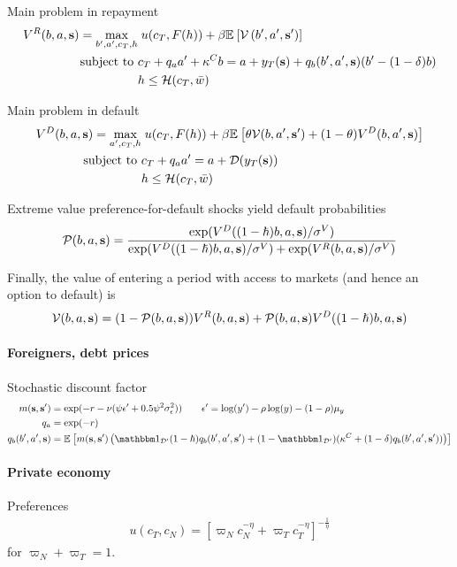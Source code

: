 Main problem in repayment
\begin{align}
	V^R(b,a,\text{\textbf{s}}) = \max_{b',a',c_T, h} &\; u(c_T, F(h)) + \beta \mathbb{E}_{{}}\left[ \mathcal{V}\left(b',a',\text{\textbf{s}}'\right) \right] \\
	\text{subject to }
	& c_T + q_a a' + \kappa^C b = a + y_T(\text{\textbf{s}}) + q_b(b',a',\text{\textbf{s}}) (b' - (1-\delta) b) \notag\\
	& h \leq \mathcal{H}(c_T, \bar{w}) \notag
\end{align}

Main problem in default
\begin{align}
	V^D(b,a,\text{\textbf{s}}) = \max_{a',c_T, h} &\; u(c_T, F(h)) + \beta \mathbb{E}_{{}}\left[  \theta \mathcal{V}(b,a',\text{\textbf{s}}') + (1-\theta) V^D(b,a',\text{\textbf{s}})  \right] \\
	\text{subject to }
	& c_T + q_a a' = a + \mathcal{D}(y_T(\text{\textbf{s}})) \notag \\
	& h \leq \mathcal{H}(c_T, \bar{w}) \notag
\end{align}

Extreme value preference-for-default shocks yield default probabilities
\begin{align}
	\mathcal{P}(b,a,\text{\textbf{s}}) = \frac{ \exp(V^D((1-\hslash)b,a,\text{\textbf{s}}) / \sigma^V) }{\exp(V^D((1-\hslash)b,a,\text{\textbf{s}}) / \sigma^V) + \exp(V^R(b,a,\text{\textbf{s}}) / \sigma^V)}
\end{align}

Finally, the value of entering a period with access to markets (and hence an option to default) is
\begin{align}
	\mathcal{V}(b,a,\text{\textbf{s}}) = (1-\mathcal{P}(b,a,\text{\textbf{s}})) V^R(b,a,\text{\textbf{s}}) + \mathcal{P}(b,a,\text{\textbf{s}}) V^D((1-\hslash)b,a,\text{\textbf{s}})
\end{align}

\paragraph{Foreigners, debt prices}
Stochastic discount factor
\begin{align}
	m(\state, \state') &= \exp(-r - \nu (\psi \epsilon' + 0.5 \psi^2\sigma_\epsilon^2)) \qquad \epsilon' = \log(y') - \rho\log(y) - (1-\rho)\mu_y\\
	q_a &= \exp(-r) \\
	q_b(b',a',\state) &= \ex{ m(\state,\state') \left(\ind_\mathcal{D'} (1-\hslash) q_b(b',a',\state') + (1-\ind_\mathcal{D'})(\kappa^C + (1-\delta)q_b(b',a',\state')) \right) }
\end{align}

\paragraph{Private economy}
Preferences
\begin{align}
	u(c_T,c_N) = \left[ \varpi_N c_N^{-\eta} + \varpi_T c_T^{-\eta} \right]^{-\frac{1}{\eta}}
\end{align}
for $\varpi_N + \varpi_T = 1$.


